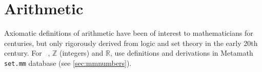 %
%
%
%
%
%
%
%
%
%
%

\section{Arithmetic}\label{sec:informal_Arithmetic}

\pn Axiomatic definitions of arithmetic have been of interest to mathematicians for centuries, but only rigorously derived from logic and set theory in the early 20th century.  For \lang~, $\mathbb{Z}$ (integers) and $\mathbb{R}$, use definitions and derivations in Metamath \texttt{set.mm} database (see \ref{sec:mmnumbers}).

